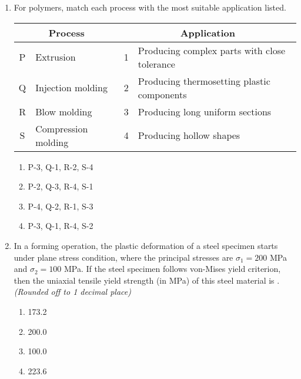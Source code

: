 \documentclass[journal,12pt,onecolumn]{IEEEtran}
\theoremstyle{remark}
\begin{document}
\begin{enumerate}
\item For polymers, match each process with the most suitable application listed.
\begin{center}
\begin{tabular}{|c|l|c|l|}
\hline
\multicolumn{2}{|c|}{\textbf{Process}} & \multicolumn{2}{|c|}{\textbf{Application}} \\
\hline
P & Extrusion & 1 & Producing complex parts with close tolerance \\
Q & Injection molding & 2 & Producing thermosetting plastic components \\
R & Blow molding & 3 & Producing long uniform sections \\
S & Compression molding & 4 & Producing hollow shapes \\
\hline
\end{tabular}
\end{center}
\begin{multicols}{4}
\begin{enumerate}
    \item P-3, Q-1, R-2, S-4
    \item P-2, Q-3, R-4, S-1
    \item P-4, Q-2, R-1, S-3
    \item P-3, Q-1, R-4, S-2
\end{enumerate}
\end{multicols}
\vspace{1cm}

\item In a forming operation, the plastic deformation of a steel specimen starts under plane stress condition, where the principal stresses are $\sigma_1 = 200$ MPa and $\sigma_2 = 100$ MPa. If the steel specimen follows von-Mises yield criterion, then the uniaxial tensile yield strength (in MPa) of this steel material is \underline{\hspace{2cm}}. \textit{(Rounded off to 1 decimal place)}
\begin{multicols}{4}
\begin{enumerate}
    \item 173.2
    \item 200.0
    \item 100.0
    \item 223.6
\end{enumerate}
\end{multicols}
\vspace{1cm}


\end{enumerate}
\end{document}
